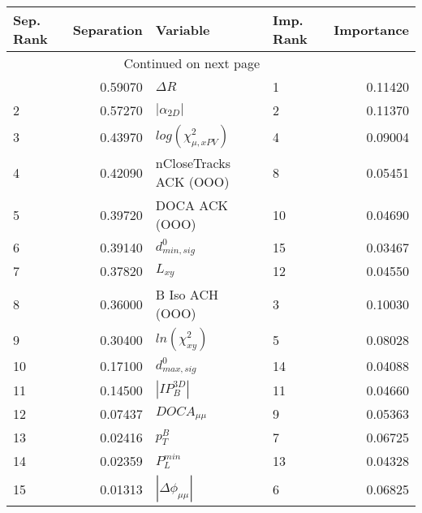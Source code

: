 \usepackage{lscape}

\begin{landscape}
\begin{longtable}{lrllr}
\toprule
Sep. Rank &  Separation &                   Variable & Imp. Rank &  Importance \\
\midrule
\endhead
\midrule
\multicolumn{3}{r}{{Continued on next page}} \\
\midrule
\endfoot

\bottomrule
\endlastfoot
        1 &     0.59070 &                 $\Delta R$ &         1 &     0.11420 \\
        2 &     0.57270 &            $|\alpha_{2D}|$ &         2 &     0.11370 \\
        3 &     0.43970 &  $log(\chi^{2}_{\mu,xPV})$ &         4 &     0.09004 \\
        4 &     0.42090 &     nCloseTracks ACK (OOO) &         8 &     0.05451 \\
        5 &     0.39720 &             DOCA ACK (OOO) &        10 &     0.04690 \\
        6 &     0.39140 &           $d^0_{min, sig}$ &        15 &     0.03467 \\
        7 &     0.37820 &                   $L_{xy}$ &        12 &     0.04550 \\
        8 &     0.36000 &            B Iso ACH (OOO) &         3 &     0.10030 \\
        9 &     0.30400 &        $ln(\chi^{2}_{xy})$ &         5 &     0.08028 \\
       10 &     0.17100 &           $d^0_{max, sig}$ &        14 &     0.04088 \\
       11 &     0.14500 &            $|IP_{B}^{3D}|$ &        11 &     0.04660 \\
       12 &     0.07437 &            $DOCA_{\mu\mu}$ &         9 &     0.05363 \\
       13 &     0.02416 &                  $p^B_{T}$ &         7 &     0.06725 \\
       14 &     0.02359 &              $P^{min}_{L}$ &        13 &     0.04328 \\
       15 &     0.01313 &   $|\Delta \phi_{\mu\mu}|$ &         6 &     0.06825 \\
\end{longtable}

\end{landscape}
